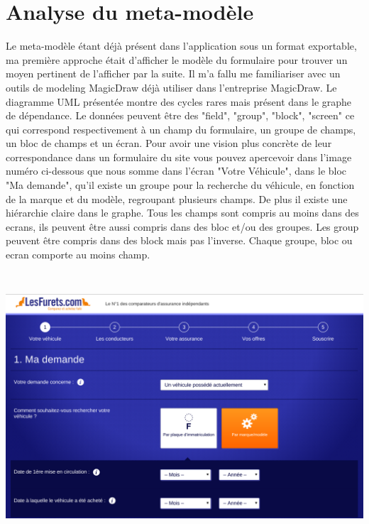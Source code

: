 \section{Analyse du meta-modèle}
Le meta-modèle étant déjà présent dans l'application sous un format exportable, ma première approche était d'afficher le modèle du formulaire pour trouver un moyen pertinent de l'afficher par la suite. Il m'a fallu me familiariser avec un outils de modeling MagicDraw déjà utiliser dans l'entreprise MagicDraw. Le diagramme UML présentée montre des cycles rares mais présent dans le graphe de dépendance. Le données peuvent être des "field", "group", "block", "screen" ce qui correspond respectivement à un champ du formulaire, un groupe de champs, un bloc de champs et un écran. Pour avoir une vision plus concrète de leur correspondance dans un formulaire du site vous pouvez apercevoir dans l'image numéro ci-dessous que nous somme dans l'écran "Votre Véhicule", dans le bloc "Ma demande", qu'il existe un groupe pour la recherche du véhicule, en fonction de la marque et du modèle, regroupant plusieurs champs.  De plus il existe une hiérarchie claire dans le graphe. Tous les champs sont compris au moins dans des ecrans, ils peuvent être aussi compris dans des bloc et/ou des groupes. Les group peuvent être compris dans des block mais pas l'inverse. Chaque groupe, bloc ou ecran comporte au moins champ.
\begin{center}
\vspace{0.5cm} 
\includegraphics[height=10cm]{fields.png}
\end{center}

